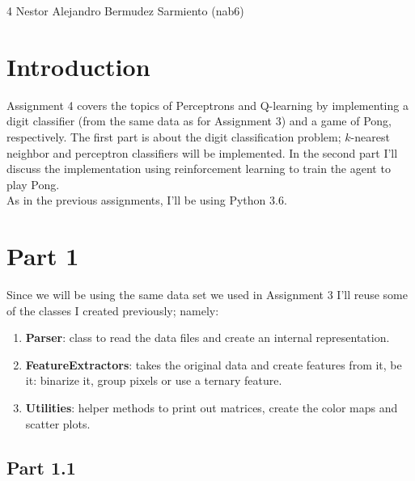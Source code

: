 \documentclass[11pt]{article}
\begin{document}
\homework
    {4}
    {Nestor Alejandro Bermudez Sarmiento (nab6)}
    {}

\section*{Introduction}

Assignment 4 covers the topics of Perceptrons and Q-learning by implementing a digit classifier (from the same data as for Assignment 3) and a game of Pong, respectively. The first part is about the digit classification problem; $k$-nearest neighbor and perceptron classifiers will be implemented. In the second part I'll discuss the implementation using reinforcement learning to train the agent to play Pong. \\

As in the previous assignments, I'll be using Python 3.6. 

\section*{Part 1}

Since we will be using the same data set we used in Assignment 3 I'll reuse some of the classes I created previously; namely:
\begin{enumerate}
\item \textbf{Parser}: class to read the data files and create an internal representation. 

\item \textbf{FeatureExtractors}: takes the original data and create features from it, be it: binarize it, group pixels or use a ternary feature. 

\item \textbf{Utilities}: helper methods to print out matrices, create the color maps and scatter plots. 
\end{enumerate}

\subsection*{Part 1.1}
\end{document}

